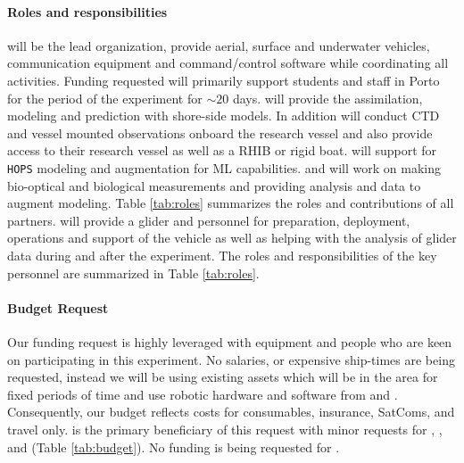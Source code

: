 \paragraph{Roles and responsibilities} \univ will be the lead
organization, provide aerial, surface and underwater vehicles,
communication equipment and command/control software while
coordinating all activities. Funding requested will primarily support
students and staff in Porto for the period of the experiment for
$\sim 20$ days. \inst will provide the assimilation, modeling and
prediction with shore-side models. In addition \inst will conduct CTD
and vessel mounted observations onboard the research vessel and also
provide access to their research vessel as well as a RHIB or rigid
boat. \mit will support \inst for \texttt{HOPS} modeling and
augmentation for ML capabilities. \colo and \ave will work on making
bio-optical and biological measurements and providing analysis and
data to augment \inst modeling. Table \ref{tab:roles} summarizes the
roles and contributions of all partners. \soc will provide a glider
and personnel for preparation, deployment, operations and support of
the vehicle as well as helping with the analysis of glider data during
and after the experiment. The roles and responsibilities of the key
personnel are summarized in Table \ref{tab:roles}.


\paragraph{Budget Request} Our funding request is highly leveraged
with equipment and people who are keen on participating in this
experiment. No salaries, or expensive ship-times are being requested,
instead we will be using existing assets which will be in the \naz
area for fixed periods of time and use robotic hardware and software
from \univ and \soce. Consequently, our budget reflects costs for
consumables, insurance, SatComs, and travel only. \univ is the primary
beneficiary of this request with minor requests for \inste, \avee,
\colo and \soc (Table \ref{tab:budget}). No funding is being
requested for \mite.

